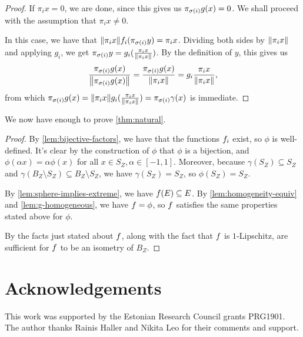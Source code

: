 \documentclass{amsart}
\theoremstyle{definition}
\begin{document}
\begin{proof}
	If $\pi_i x = 0$, we are done, since this gives us
	$\pi_{\sigma(i)} g(x) = 0$. We shall proceed with the assumption that
  $\pi_i x \neq 0$.

	In this case, we have that
  $\norm{\pi_i x}f_i (\pi_{\sigma(i)} y) = \pi_i x$.
	Dividing both sides by $\norm{\pi_i x}$ and applying $g_i$, we get
	$\pi_{\sigma(i)} y = g_i (\frac{\pi_i x}{\norm{\pi_i x}})$.
	By the definition of $y$, this gives us
  \[ \frac{\pi_{\sigma(i)} g(x)}{\norm{{\pi_{\sigma(i)} g(x)}}} = \frac{\pi_{\sigma(i)} g(x)}{\norm{\pi_i x}} = g_i \frac{\pi_i x}{\norm{\pi_i x}}, \]
	from which
	${\pi_{\sigma(i)} g(x)} = \norm{\pi_i x}g_i (\frac{\pi_i x}{\norm{\pi_i x}}) = \pi_{\sigma(i)} \gamma(x)$
	is immediate.
\end{proof}

We now have enough to prove \autoref{thm:natural}.

\begin{proof} 

  By \autoref{lem:bijective-factors}, we have that the functions $f_i$ exist,
  so $\phi$ is well-defined.
  It's clear by the construction of $\phi$ that $\phi$ is a bijection, and $\phi(\alpha x) = \alpha \phi(x)$
  for all $x \in S_Z, \alpha \in [-1,1]$. Moreover, because $\gamma(S_Z) \subseteq S_Z$ and $\gamma(B_Z\setminus S_Z) \subseteq B_Z \setminus S_Z$, we have $\gamma(S_Z) = S_Z$, so $\phi(S_Z) = S_Z$.

  

  By \autoref{lem:sphere-implies-extreme}, we have $f(E) \subseteq E$.
  By \autoref{lem:homogeneity-equiv} and \autoref{lem:g-homogeneous}, we have $f = \phi$,
  so $f$ satisfies the same properties stated above for $\phi$.

By \autocite[Lemma 2.5]{cascales:2016}
  the facts just stated about $f$, along with the fact that $f$ is $1$‑Lipschitz, are sufficient for $f$ to be an isometry of $B_Z$.
\end{proof}


\section*{Acknowledgements}

This work was supported by the Estonian Research Council grants PRG1901. The author thanks Rainis Haller and Nikita Leo for their comments and support.


\printbibliography
\end{document}
